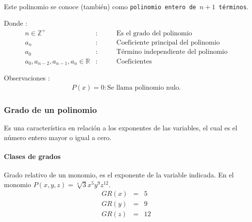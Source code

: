 \documentclass[11pt, twocolumn, landscape, a4paper]{article}
\begin{document}
\noindent Este polinomio se conoce (también) como {\tt polinomio entero de $n + 1$ términos}.

\noindent Donde :
\begin{eqnarray*}
n \in \mathbb{Z}^{+} &:& \qquad\text{Es el grado del polinomio}\\
a_n &:& \qquad\text{Coeficiente principal del polinomio}\\
a_0 &:& \qquad\text{Término independiente del polinomio} \\
a_0, a_{n-2}, a_{n-1}, a_{n} \in \mathbb{R} &:& \qquad\text{Coeficientes}
\end{eqnarray*}

\noindent Observaciones :
\begin{eqnarray*}
P(x) = 0 : \text{Se llama polinomio nulo.}
\end{eqnarray*}

\subsubsection*{Grado de un polinomio}
Es una característica en relación a los exponentes de las variables, el cual es el número entero mayor o igual a cero.

\paragraph*{Clases de grados}
Grado relativo de un monomio, es el exponente de la variable indicada. En el monomio $P(x, y, z) = \sqrt[4]{3}x^5y^9z^{12}$.
\begin{eqnarray*}
GR(x) &=& 5 \\ 
GR(y) &=& 9 \\ 
GR(z) &=& 12 
\end{eqnarray*}
\end{document}
